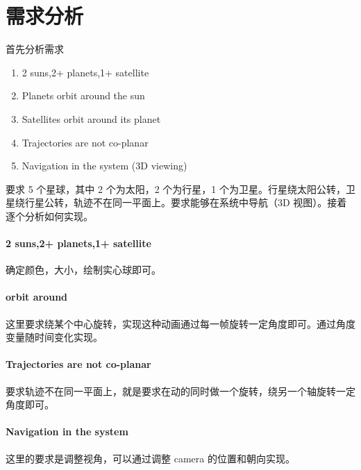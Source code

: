 \documentclass[12pt,hyperref,a4paper,UTF8]{ctexart}
\begin{document}
\cover


\thispagestyle{empty} %

\newpage
\tableofcontents

\newpage
\section{需求分析}
首先分析需求

\begin{shaded*}
    \begin{enumerate}
        \item 2 suns,2+ planets,1+ satellite 
        \item Planets orbit around the sun 
        \item Satellites orbit around its planet 
        \item Trajectories are not co-planar 
        \item Navigation in the system (3D viewing) 
    \end{enumerate}
\end{shaded*}

要求 5 个星球，其中 2 个为太阳，2 个为行星，1 个为卫星。行星绕太阳公转，卫星绕行星公转，轨迹不在同一平面上。要求能够在系统中导航（3D 视图）。接着逐个分析如何实现。

\paragraph{2 suns,2+ planets,1+ satellite}
确定颜色，大小，绘制实心球即可。

\paragraph{orbit around}
这里要求绕某个中心旋转，实现这种动画通过每一帧旋转一定角度即可。通过角度变量随时间变化实现。

\paragraph{Trajectories are not co-planar}
要求轨迹不在同一平面上，就是要求在动的同时做一个旋转，绕另一个轴旋转一定角度即可。

\paragraph{Navigation in the system}
这里的要求是调整视角，可以通过调整 camera 的位置和朝向实现。
\end{document}
